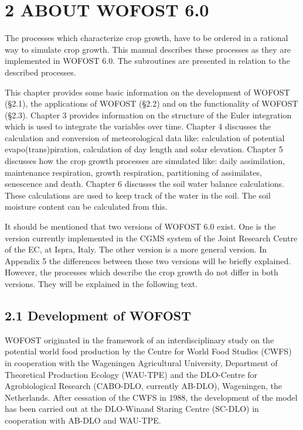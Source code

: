 \documentclass[11pt]{article}
\begin{document}
\setcounter{page}{10}\pagenumpos{\pnbr}
\section{  2 ABOUT WOFOST 6.0  }

\bigskip
\bigskip
The processes which characterize crop growth, have to be ordered in a rational way to
simulate crop growth. This manual describes these processes as they are imple\-ment\-ed in
WOFOST 6.0. The subroutines are presented in relation to the described process\-es. 

\bigskip
This chapter provides some basic information on the development of WOFOST (\S 2.1),
the applications of WOFOST (\S 2.2) and on the function\-ality of WOFOST (\S 2.3). Chapter
3 provides information on the structure of the Euler integra\-tion which is used to integrate
the variables over time. Chapter 4 discusses the calculation and conversion of meteorolog\-ical data like: calculation of potential evapo\-(trans)piration, calculation of day length and
solar elevation. Chapter 5 discusses how the crop growth processes are simulated like:
daily assimilation, mainte\-nance respiration, growth respira\-tion, parti\-tioning of assimilates,
senes\-cence and death. Chapter 6 discusses the soil water balance calcula\-tions. These
calculations are used to keep track of the water in the soil. The soil moisture content can
be calculated from this.

\bigskip
It should be mentioned that two versions of WOFOST 6.0 exist. One is the version
currently implemented in the CGMS system of the Joint Research Centre of the EC, at
Ispra, Italy. The other version is a more general version. In Appendix 5 the differences
between these two versions will be briefly explained. However, the processes which
describe the crop growth do not differ in both versions. They will be explained in the
following text.

\bigskip
\bigskip

\subsection{  2.1 Development of WOFOST  }

WOFOST originated in the framework of an interdisciplinary study on the potential world
food production by the Centre for World Food Studies (CWFS) in coopera\-tion with the
Wageningen Agricultu\-ral Univer\-sity, Depart\-ment of Theoretical Production Ecology
(WAU-TPE) and the DLO-Centre for Agrobiolo\-gi\-cal Re\-search (CABO-DLO, currently
AB-DLO), Wagenin\-gen, the Nether\-lands. After cessa\-tion of the CWFS in 1988, the deve\-lopment of the model has been carried out at the DLO-Winand Staring Centre (SC-DLO)
in cooperation with AB-DLO and WAU-TPE.
\end{document}
